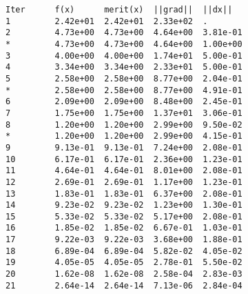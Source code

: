 \begin{lstlisting}[style=OptizelleOutput,caption={Optizelle generates this output when running the Rosenbrock example in Listing \ref{lst:Rosen}.  We explain this output in Chapter \ref{ch:Output}.},label=lst:RosenOut]
Iter      f(x)      merit(x)  ||grad||  ||dx||    
1         2.42e+01  2.42e+01  2.33e+02  .         
2         4.73e+00  4.73e+00  4.64e+00  3.81e-01  
*         4.73e+00  4.73e+00  4.64e+00  1.00e+00  
3         4.00e+00  4.00e+00  1.74e+01  5.00e-01  
4         3.34e+00  3.34e+00  2.33e+01  5.00e-01  
5         2.58e+00  2.58e+00  8.77e+00  2.04e-01  
*         2.58e+00  2.58e+00  8.77e+00  4.91e-01  
6         2.09e+00  2.09e+00  8.48e+00  2.45e-01  
7         1.75e+00  1.75e+00  1.37e+01  3.06e-01  
8         1.20e+00  1.20e+00  2.99e+00  9.50e-02  
*         1.20e+00  1.20e+00  2.99e+00  4.15e-01  
9         9.13e-01  9.13e-01  7.24e+00  2.08e-01  
10        6.17e-01  6.17e-01  2.36e+00  1.23e-01  
11        4.64e-01  4.64e-01  8.01e+00  2.08e-01  
12        2.69e-01  2.69e-01  1.17e+00  1.23e-01  
13        1.83e-01  1.83e-01  6.37e+00  2.08e-01  
14        9.23e-02  9.23e-02  1.23e+00  1.30e-01  
15        5.33e-02  5.33e-02  5.17e+00  2.08e-01  
16        1.85e-02  1.85e-02  6.67e-01  1.03e-01  
17        9.22e-03  9.22e-03  3.68e+00  1.88e-01  
18        6.89e-04  6.89e-04  5.82e-02  4.05e-02  
19        4.05e-05  4.05e-05  2.78e-01  5.50e-02  
20        1.62e-08  1.62e-08  2.58e-04  2.83e-03  
21        2.64e-14  2.64e-14  7.13e-06  2.84e-04 


\end{lstlisting}
